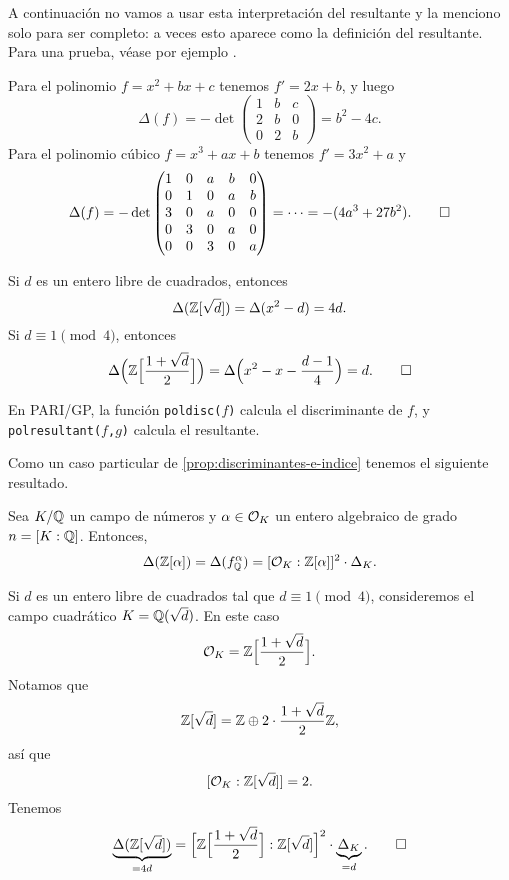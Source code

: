 A continuación no vamos a usar esta interpretación del resultante y la menciono
solo para ser completo: a veces esto aparece como la definición del resultante.
Para una prueba, véase por ejemplo \cite[\S 3.3]{Cohen-GTM138}.

\begin{ejemplo}
  Para el polinomio $f = x^2 + bx + c$ tenemos $f' = 2x + b$, y luego
  \[ \Delta (f) = -\det \begin{pmatrix}
    1 & b & c \\
    2 & b & 0 \\
    0 & 2 & b
  \end{pmatrix} = b^2 - 4c. \]
  Para el polinomio cúbico $f = x^3 + ax + b$ tenemos $f' = 3x^2 + a$ y
  \[ \Delta (f) = -\det \begin{pmatrix}
    1 & 0 & a & b & 0 \\
    0 & 1 & 0 & a & b \\
    3 & 0 & a & 0 & 0 \\
    0 & 3 & 0 & a & 0 \\
    0 & 0 & 3 & 0 & a
  \end{pmatrix} = \cdots = - (4a^3 + 27b^2). \qedhere \]
\end{ejemplo}

\begin{ejemplo}
  Si $d$ es un entero libre de cuadrados, entonces
  $$\Delta (\mathbb{Z} [\sqrt{d}]) = \Delta (x^2 - d) = 4d.$$
  Si $d \equiv 1 \pmod{4}$, entonces
  \[ \Delta \Bigl(\mathbb{Z} \Bigl[\frac{1 + \sqrt{d}}{2}\Bigr]\Bigr)
   = \Delta \Bigl(x^2 - x - \frac{d-1}{4}\Bigr) = d. \qedhere \]
\end{ejemplo}

En PARI/GP, la función \texttt{poldisc($f$)} calcula el discriminante de $f$,
y \texttt{polresultant($f$,$g$)} calcula el resultante.

\vspace{1em}

Como un caso particular de \ref{prop:discriminantes-e-indice} tenemos
el siguiente resultado.

\begin{proposicion}
  \label{prop:discriminante-de-Z-alpha-en-OK}
  Sea $K/\mathbb{Q}$ un campo de números y $\alpha \in \mathcal{O}_K$ un entero algebraico de
  grado $n = [K : \mathbb{Q}]$. Entonces,
  \[ \Delta (\mathbb{Z} [\alpha]) = \Delta (f^\alpha_{\mathbb{Q}}) =
     [\mathcal{O}_K : \mathbb{Z} [\alpha]]^2 \cdot \Delta_K. \]
\end{proposicion}

\begin{ejemplo}
  Si $d$ es un entero libre de cuadrados tal que $d \equiv 1 \pmod{4}$,
  consideremos el campo cuadrático $K = \mathbb{Q} (\sqrt{d})$. En este caso
  $$\mathcal{O}_K = \mathbb{Z} \Bigl[\frac{1+\sqrt{d}}{2}\Bigr].$$
  Notamos que
  $$\mathbb{Z} [\sqrt{d}] = \mathbb{Z} \oplus 2\cdot \frac{1+\sqrt{d}}{2}\mathbb{Z},$$
  así que
  $$[\mathcal{O}_K : \mathbb{Z} [\sqrt{d}]] = 2.$$
  Tenemos
  \[ \underbrace{\Delta (\mathbb{Z} [\sqrt{d}])}_{= 4d} =
  \Bigl[\mathbb{Z} \Bigl[\frac{1+\sqrt{d}}{2}\Bigr] : \mathbb{Z} [\sqrt{d}] \Bigr]^2 \cdot
  \underbrace{\Delta_K}_{=d}. \qedhere \]
\end{ejemplo}

